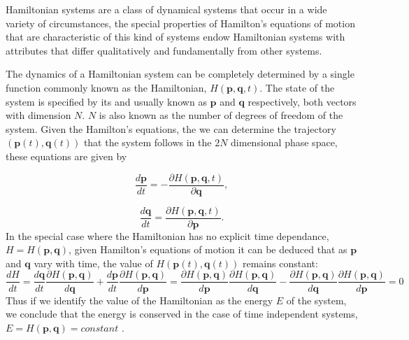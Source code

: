 Hamiltonian systems are a class of dynamical systems that occur in a wide variety of circumstances, the special properties of Hamilton's equations of motion that are characteristic of this kind of systems endow Hamiltonian systems with attributes that differ qualitatively and fundamentally from other systems.\par 

The dynamics of a Hamiltonian system can be completely determined by a single function commonly known as the Hamiltonian, $H(\bm{p},\bm{q},t)$. The state of the system is specified by its  and  usually known as $\bm{p}$ and $\bm{q}$ respectively, both vectors with dimension $N$. $N$ is also known as the number of degrees of freedom of the system. Given the Hamilton's equations, the we can determine the trajectory  $(\bm{p}(t),\bm{q}(t))$ that the system follows in the $2N$ dimensional phase space, these equations are given by

\begin{equation}
\frac{d \bm{p}}{dt} =-\frac{\partial H(\bm{p},\bm{q},t)}{\partial \bm{q}},
\label{eq:pdot_hamil}
\end{equation}
\par 
\begin{equation}
\frac{d \bm{q}}{dt} =\frac{\partial H(\bm{p},\bm{q},t)}{\partial \bm{p}}.
\label{eq:qdot_hamil}
\end{equation}
In the special case where the Hamiltonian has no explicit time dependance, $H=H(\bm{p},\bm{q})$, given  Hamilton's equations of motion it can be deduced that as $\bm{p}$ and $\bm{q}$ vary with time, the value of $H(\bm{p}(t),\bm{q}(t))$ remains constant:
\begin{equation*}
\frac{dH}{dt}=\frac{d\bm{q}}{dt}\frac{\partial H(\bm{p},\bm{q})}{d\bm{q}}+\frac{d\bm{p}}{dt}\frac{\partial H(\bm{p},\bm{q})}{d\bm{p}}=\frac{\partial H(\bm{p},\bm{q})}{d\bm{p}}\frac{\partial H(\bm{p},\bm{q})}{d\bm{q}}-\frac{\partial H(\bm{p},\bm{q})}{d\bm{q}}\frac{\partial H(\bm{p},\bm{q})}{d\bm{p}}=0
\end{equation*}
Thus if we identify the value of the Hamiltonian as the energy $E$ of the system, we conclude that the energy is conserved in the case of time independent systems, $E=H(\bm{p},\bm{q})=constant$ \cite{ott_chaos_2002}.\par

